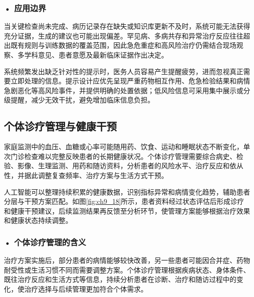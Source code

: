 \subsubsection*{\textbf{• 应用边界}}

当关键检查尚未完成、病历记录存在缺失或知识库更新不及时，系统可能无法获得充分证据，生成的建议也可能出现偏差。罕见病、多病共存和异常治疗反应往往超出既有规则与训练数据的覆盖范围，因此急危重症和高风险治疗仍需结合现场观察、多学科意见、患者意愿及最新临床证据作出决定。

系统频繁发出缺乏针对性的提示时，医务人员容易产生提醒疲劳，进而忽视真正需要立即处理的信息。提示设计应优先呈现严重药物相互作用、危急检验结果和病情急剧恶化等高风险事件，并提供明确的处置依据；低风险信息可采用集中展示或分级提醒，减少无效干扰，避免增加临床信息负担。

\subsection{个体诊疗管理与健康干预}

家庭监测中的血压、血糖或心率可能随用药、饮食、运动和睡眠状态不断变化，单次门诊检查难以完整反映患者的长期健康状况。个体诊疗管理需要综合病史、检验、影像、生理监测、用药和随访资料，分析患者的风险水平、治疗反应和依从性，并据此调整复查频率、治疗方案与生活方式干预。

人工智能可以整理持续积累的健康数据，识别指标异常和病情变化趋势，辅助患者分层与干预方案匹配。如图\ref{fig:ch9_18}所示，患者资料经过状态评估后形成诊疗和健康干预建议，后续监测结果再反馈至分析环节，使管理方案能够根据治疗效果和健康状态持续调整。


\par
\noindent\begin{minipage}{\textwidth}
\centering
{}
\label{fig:ch9_18}
\end{minipage}
\par

\subsubsection*{\textbf{• 个体诊疗管理的含义}}

治疗方案实施后，部分患者的病情能够较快改善，另一些患者可能因合并症、药物耐受性或生活习惯不同而需要调整方案。个体诊疗管理根据疾病状态、身体条件、既往治疗反应和生活方式等信息，持续分析患者在诊断、治疗和随访过程中的变化，使治疗选择与后续管理更加符合个体需求。

